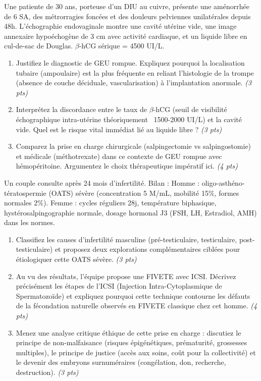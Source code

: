 \documentclass[11pt]{article}
\begin{document}
\begin{exercice}
Une patiente de 30 ans, porteuse d'un DIU au cuivre, présente une aménorrhée de 6 SA, des métrorragies foncées et des douleurs pelviennes unilatérales depuis 48h. L'échographie endovaginale montre une cavité utérine vide, une image annexaire hypoéchogène de 3 cm avec activité cardiaque, et un liquide libre en cul-de-sac de Douglas. $\beta$-hCG sérique = 4500 UI/L.
\begin{enumerate}
    \item Justifiez le diagnostic de GEU rompue. Expliquez pourquoi la localisation tubaire (ampoulaire) est la plus fréquente en reliant l'histologie de la trompe (absence de couche déciduale, vascularisation) à l'implantation anormale. \textit{(3 pts)}
    \item Interprétez la discordance entre le taux de $\beta$-hCG (seuil de visibilité échographique intra-utérine théoriquement ~1500-2000 UI/L) et la cavité vide. Quel est le risque vital immédiat lié au liquide libre ? \textit{(3 pts)}
    \item Comparez la prise en charge chirurgicale (salpingectomie vs salpingostomie) et médicale (méthotrexate) dans ce contexte de GEU rompue avec hémopéritoine. Argumentez le choix thérapeutique impératif ici. \textit{(4 pts)}
\end{enumerate}
\end{exercice}

\begin{exercice}
Un couple consulte après 24 mois d'infertilité. Bilan : Homme : oligo-asthéno-tératospermie (OATS) sévère (concentration 5 M/mL, mobilité 15\%, formes normales 2\%). Femme : cycles réguliers 28j, température biphasique, hystérosalpingographie normale, dosage hormonal J3 (FSH, LH, Estradiol, AMH) dans les normes.
\begin{enumerate}
    \item Classifiez les causes d'infertilité masculine (pré-testiculaire, testiculaire, post-testiculaire) et proposez deux explorations complémentaires ciblées pour étiologiquer cette OATS sévère. \textit{(3 pts)}
    \item Au vu des résultats, l'équipe propose une FIVETE avec ICSI. Décrivez précisément les étapes de l'ICSI (Injection Intra-Cytoplasmique de Spermatozoïde) et expliquez pourquoi cette technique contourne les défauts de la fécondation naturelle observés en FIVETE classique chez cet homme. \textit{(4 pts)}
    \item Menez une analyse critique éthique de cette prise en charge : discutiez le principe de non-malfaisance (risques épigénétiques, prématurité, grossesses multiples), le principe de justice (accès aux soins, coût pour la collectivité) et le devenir des embryons surnuméraires (congélation, don, recherche, destruction). \textit{(3 pts)}
\end{enumerate}
\end{exercice}
\end{document}
